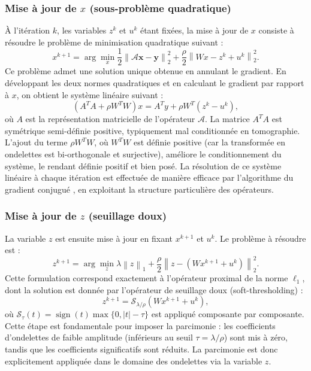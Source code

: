 \subsubsection*{Mise à jour de \(x\) (sous-problème quadratique)}
À l'itération \(k\), les variables \(z^k\) et \(u^k\) étant fixées, la mise à jour de \(x\) consiste à résoudre le problème de minimisation quadratique suivant :
\begin{equation}
x^{k+1} = \arg\min_{x} \frac{1}{2}\left\| \mathcal{A}\mathbf{x} - \mathbf{y} \right\|_{2}^{2} + \frac{\rho}{2}\left\| Wx - z^{k} + u^{k} \right\|_{2}^{2}.
\end{equation}
Ce problème admet une solution unique obtenue en annulant le gradient. En développant les deux normes quadratiques et en calculant le gradient par rapport à \(x\), on obtient le système linéaire suivant :
\begin{equation}
\left(A^T A + \rho W^T W\right)x = A^T y + \rho W^T \left(z^k - u^k\right),
\end{equation}
où \(A\) est la représentation matricielle de l'opérateur \(\mathcal{A}\). La matrice \(A^T A\) est symétrique semi-définie positive, typiquement mal conditionnée en tomographie. L'ajout du terme \(\rho W^T W\), où \(W^T W\) est définie positive (car la transformée en ondelettes est bi-orthogonale et surjective), améliore le conditionnement du système, le rendant définie positif et bien posé. La résolution de ce système linéaire à chaque itération est effectuée de manière efficace par l'algorithme du gradient conjugué \cite{28}, en exploitant la structure particulière des opérateurs.

\subsubsection*{Mise à jour de \(z\) (seuillage doux)}
La variable \(z\) est ensuite mise à jour en fixant \(x^{k+1}\) et \(u^{k}\). Le problème à résoudre est :
\begin{equation}
z^{k+1} = \arg\min_{z} \lambda \left\|z\right\|_{1} + \frac{\rho}{2}\left\| z - \left(Wx^{k+1} + u^{k}\right) \right\|_{2}^{2}.
\end{equation}
Cette formulation correspond exactement à l'opérateur proximal \cite{29} de la norme \(\ell_1\), dont la solution est donnée par l'opérateur de seuillage doux (soft-thresholding) :
\begin{equation}
z^{k+1} = \mathcal{S}_{\lambda / \rho}\left(Wx^{k+1} + u^{k}\right),
\end{equation}
où \(\mathcal{S}_{\tau}(t) = \operatorname{sign}(t) \max\{0, |t| - \tau\}\) est appliqué composante par composante. Cette étape est fondamentale pour imposer la parcimonie : les coefficients d'ondelettes de faible amplitude (inférieurs au seuil \(\tau = \lambda/\rho\)) sont mis à zéro, tandis que les coefficients significatifs sont réduits. La parcimonie est donc explicitement appliquée dans le domaine des ondelettes via la variable \(z\).

